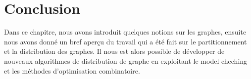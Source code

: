 





\section{Conclusion}{
Dans ce chapitre, nous avons introduit quelques notions sur les graphes, ensuite nous avons donné un bref aperçu du travail qui a été fait sur le partitionnement et la distribution des graphes. Il nous est alors possible de développer de nouveaux algorithmes de distribution de graphe en exploitant le model cheching et les méthodes  d'optimisation combinatoire.
}